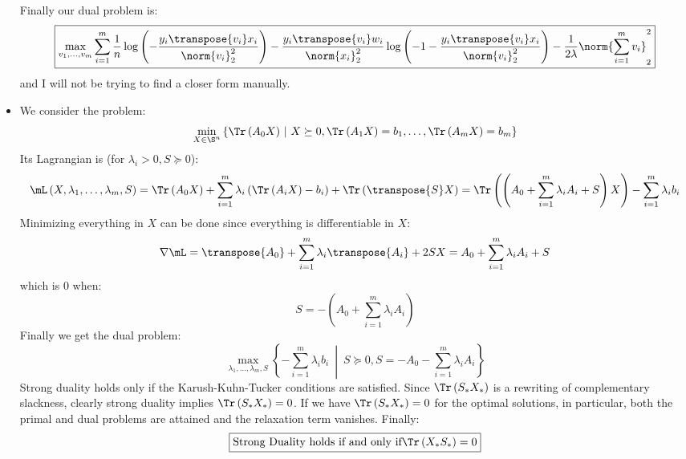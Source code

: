 \documentclass[math, info]{cours}
\begin{document}
\begin{itemize}
\begin{equation*}
		\end{equation*}
		Finally our dual problem is:
		\begin{equation*}
			\boxed{\max_{v_{1}, \ldots, v_{m}}\sum_{i = 1}^{m}\frac{1}{n} \log\left( -\frac{y_{i}\transpose{v_{i}}x_{i}}{\norm{v_{i}}_{2}^{2}} \right)- \frac{y_{i}\transpose{v_{i}}w_{i}}{\norm{x_{i}}_{2}^{2}}\log\left( -1 - \frac{y_{i}\transpose{v_{i}}x_{i}}{\norm{v_{i}}_{2}^{2}} \right) - \frac{1}{2\lambda} \norm{\sum_{i = 1}^{m}v_{i}}_{2}^{2}}
		\end{equation*}
		and I will not be trying to find a closer form manually.
	\item We consider the problem:
		\begin{equation*}
			\min_{X\in \S^{n}} \left\{ \Tr\left( A_{0}X \right)\ \middle|\ X \succeq 0, \Tr\left( A_{1}X \right) = b_{1}, \ldots, \Tr\left( A_{m}X \right) = b_{m} \right\}
		\end{equation*}
		Its Lagrangian is (for $\lambda_{i} > 0, S \succeq 0$):
		\begin{equation*}
			\mL\left( X, \lambda_{1}, \ldots, \lambda_{m}, S\right) = \Tr\left( A_{0}X \right) + \sum_{i = 1}^{m}\lambda_{i}\left( \Tr\left( A_{i}X \right) - b_{i} \right) + \Tr\left( \transpose{S}X \right) = \Tr\left( \left( A_{0} + \sum_{i = 1}^{m} \lambda_{i}A_{i} + S \right)X \right) - \sum_{i = 1}^{m}\lambda_{i}b_{i}
		\end{equation*}
		Minimizing everything in $X$ can be done since everything is differentiable in $X$:
		\begin{equation*}
			\nabla \mL = \transpose{A_{0}} + \sum_{i = 1}^{m}\lambda_{i}\transpose{A_{i}} + 2 SX = A_{0} + \sum_{i = 1}^{m}\lambda_{i}A_{i} + S
		\end{equation*}
		which is $0$ when:
		\begin{equation*}
			S = -\left( A_{0} + \sum_{i = 1}^{m} \lambda_{i}A_{i}\right)
		\end{equation*}
		Finally we get the dual problem:
		\begin{equation*}
			\boxed{\max_{\lambda_{1},\ldots, \lambda_{m}, S} \left\{ -\sum_{i = 1}^{m}\lambda_{i}b_{i}\ \middle| \ S \succeq 0, S = -A_{0} - \sum_{i = 1}^{m}\lambda_{i}A_{i} \right\}}
		\end{equation*}
		Strong duality holds only if the Karush-Kuhn-Tucker conditions are satisfied.
		Since $\Tr\left( S_{*}X_{*} \right)$ is a rewriting of complementary slackness, clearly strong duality implies $\Tr\left(  S_{*}X_{*} \right) = 0$.
		If we have $\Tr\left( S_{*}X_{*} \right) = 0$ for the optimal solutions, in particular, both the primal and dual problems are attained and the relaxation term vanishes.
		Finally:
		\begin{equation*}
			\boxed{\text{Strong Duality holds if and only if} \Tr\left( X_{*}S_{*} \right) = 0}
		\end{equation*}
\end{itemize}
\end{document}
